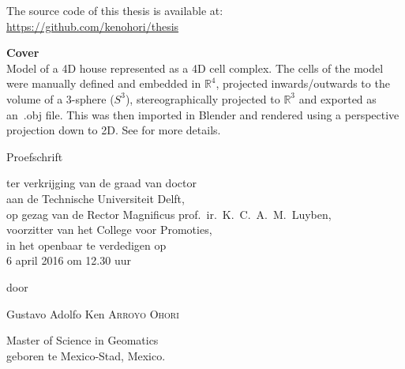 The source code of this thesis is available at: \\
\url{https://github.com/kenohori/thesis}

\textbf{Cover} \\
Model of a 4D house represented as a 4D cell complex.
The cells of the model were manually defined and embedded in $\mathbb{R}^4$, projected inwards/outwards to the volume of a 3-sphere ($S^3$), stereographically projected to $\mathbb{R}^3$ and exported as an\ {}.obj file.
This was then imported in Blender and rendered using a perspective projection down to 2D.
See  for more details.

\begin{titlepage}
\null%
\label{thesis:title}
\vspace{3em}%
\begin{center}

\vspace*{4\baselineskip}

{\makeatletter
\fanciestfont\huge\@title%
\makeatother}
\vfill


{\Large Proefschrift}

\medskip

{ter verkrijging van de graad van doctor \\
aan de Technische Universiteit Delft, \\
op gezag van de Rector Magnificus prof.~ir.~K.~C.~A.~M.~Luyben, \\
voorzitter van het College voor Promoties, \\
in het openbaar te verdedigen op \\
6 april 2016 om 12.30 uur}

\medskip

door

\medskip

\makeatletter
{\Large Gustavo Adolfo Ken {\scshape Arroyo Ohori}}
\makeatother

\medskip

Master of Science in Geomatics \\
geboren te Mexico-Stad, Mexico.

\end{center}
\end{titlepage}

